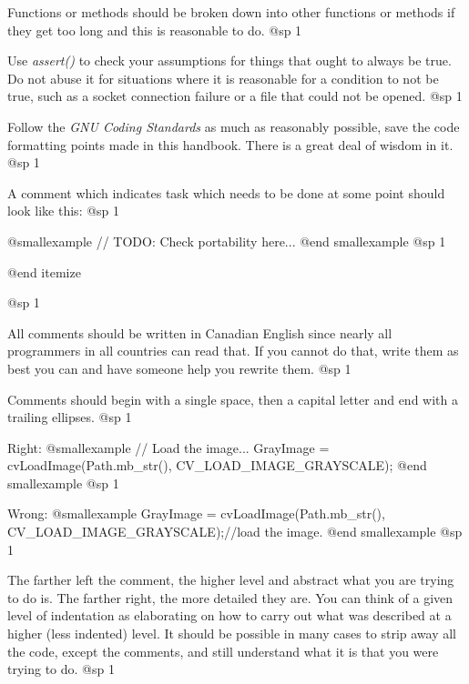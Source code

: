 \item
Functions or methods should be broken down into other functions or methods if they get too long and this is reasonable to do.
@sp 1

\item
Use {\it assert()} to check your assumptions for things that ought to always be true. Do not abuse it for situations where it is reasonable for a condition to not be true, such as a socket connection failure or a file that could not be opened.
@sp 1

\item
Follow the {\it GNU Coding Standards} as much as reasonably possible, save the code formatting points made in this handbook. There is a great deal of wisdom in it.
@sp 1

\item
A comment which indicates task which needs to be done at some point should look like this: 
@sp 1

@smallexample
// TODO: Check portability here...
@end smallexample
@sp 1

@end itemize

@sp 1

\itemize
\item
All comments should be written in Canadian English since nearly all programmers in all countries can read that. If you cannot do that, write them as best you can and have someone help you rewrite them.
@sp 1

\item
Comments should begin with a single space, then a capital letter and end with a trailing ellipses. 
@sp 1

Right:
@smallexample
// Load the image...
GrayImage = cvLoadImage(Path.mb_str(), CV_LOAD_IMAGE_GRAYSCALE);
@end smallexample
@sp 1

Wrong:
@smallexample
GrayImage = cvLoadImage(Path.mb_str(), CV_LOAD_IMAGE_GRAYSCALE);//load the image.
@end smallexample
@sp 1

\item
The farther left the comment, the higher level and abstract what you are trying to do is. The farther right, the more detailed they are. You can think of a given level of indentation as elaborating on how to carry out what was described at a higher (less indented) level. It should be possible in many cases to strip away all the code, except the comments, and still understand what it is that you were trying to do.
@sp 1

